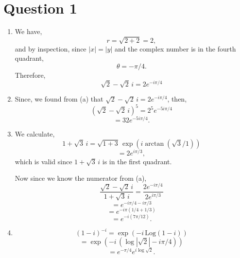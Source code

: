 \section{Question 1}
\begin{enumerate}[label=(\alph*)]
    \item 
    We have,
    \[
    r = \sqrt{2 + 2} = 2,
    \]
    and by inspection, since $|x|=|y|$ and the complex number is in the fourth quadrant,
    \[
    \theta = -\pi/4.
    \]
    Therefore,
    \[
    \sqrt{2} - \sqrt{2}\,i = 2 e^{-i\pi/4}
    \]

    \item 
    Since, we found from (a) that $\sqrt{2} - \sqrt{2}\,i = 2 e^{-i\pi/4}$, then,
    \[
    \left(\sqrt{2} - \sqrt{2}\,i\right)^5 = 2^5 e^{-5i\pi/4}
    \]
    \[
    = 32 e^{-5i\pi/4}.
    \]

    \item 
    We calculate,
    \[
    1 + \sqrt{3}\,i = \sqrt{1 + 3}\,\exp\left({i\arctan(\sqrt{3}/1)}\right)
    \]
    \[
    = 2e^{i\pi/3},
    \]
    which is valid since $1 + \sqrt{3}\,i$ is in the first quadrant.
    
    Now since we know the numerator from (a),
    \[
    \frac{\sqrt{2}-\sqrt{2}\,i}{1 + \sqrt{3}\,i} = \frac{2 e^{-i\pi/4}}{2e^{i\pi/3}}
    \]
    \[
    = e^{-i\pi/4 - i\pi/3}
    \]
    \[
    = e^{-i\pi(1/4 + 1/3)}
    \]
    \[
    = e^{-i(7\pi/12)}.
    \]

    \item 
    \[
    (1 - i)^{-i} = \exp\left(-i\,\mathrm{Log}(1-i)\right)
    \]
    \[
    = \exp\left(-i\,(\log|\sqrt{2}| - i\pi/4 )\right)
    \]
    \[
    = e^{-\pi/4}e^{i\log\sqrt{2}}.
    \]
\end{enumerate}
